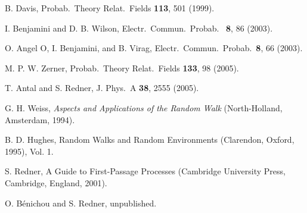 \documentclass[11pt]{iopart}
\begin{document}
\begin{thebibliography}{99}
 B. Davis,  Probab.\ Theory Relat.\ Fields {\bf 113}, 501 (1999).

 I. Benjamini and D. B. Wilson, Electr.\ Commun.\ Probab.\ {\bf
    8}, 86 (2003).

 O. Angel O, I. Benjamini, and B. Virag, Electr.\ Commun.\
  Probab.\ {\bf 8}, 66 (2003).

 M. P. W. Zerner, Probab.\ Theory Relat.\ Fields {\bf 133}, 98 (2005).

 T. Antal and S. Redner, J. Phys.\ A {\bf 38}, 2555 (2005).

 G. H. Weiss, \textit{Aspects and Applications of the Random Walk}
(North-Holland, Amsterdam, 1994).

 B. D. Hughes, Random Walks and Random Environments (Clarendon,
  Oxford, 1995), Vol. 1.


 S. Redner, A Guide to First-Passage Processes (Cambridge
  University Press, Cambridge, England, 2001).

 O. B\'enichou and S. Redner, unpublished.

\end{thebibliography}
\end{document}
